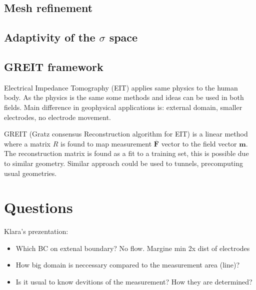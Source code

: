 \documentclass[a4paper, 12pt]{book}
\theoremstyle{definition}
\def\vc#1{\mathbf{\boldsymbol{#1}}}     %
\begin{document}
\subsection{Mesh refinement}

\subsection{Adaptivity of the $\sigma$ space}

\subsection{GREIT framework}
Electrical Impedance Tomography (EIT) applies same physics to the human body. As the physics is the same 
some methods and ideas can be used in both fields. Main difference in geophysical applications is:
external domain, smaller electrodes, no electrode movement.

GREIT (Gratz consensus Reconstruction algorithm for EIT) is a linear method where a matrix $R$ is found to map measurement 
$\overline{\vc F}$ vector to the field vector $\vc m$. The reconstruction matrix is found as a fit to a training set, this is possible 
due to similar geometry. Similar approach could be used to tunnels, precomputing usual geometries.


\section{Questions}
Klara's prezentation:
\begin{itemize}
 \item Which BC on extenal boundary? No flow. Margine min 2x dist of electrodes 
 \item How big domain is neccessary compared to the measurement area (line)?
 \item Is it usual to know devitions of the measurement? How they are determined?
\end{itemize}




\end{document}
